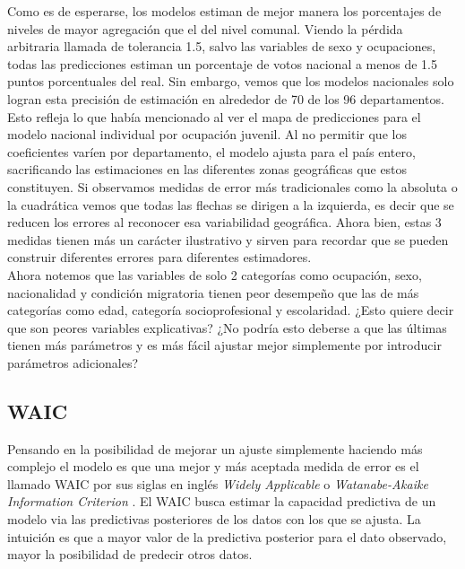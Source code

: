 Como es de esperarse, los modelos estiman de mejor manera los porcentajes de niveles de mayor agregación que el del nivel comunal. Viendo la pérdida arbitraria llamada de tolerancia 1.5, salvo las variables de sexo y ocupaciones, todas las predicciones estiman un porcentaje de votos nacional a menos de 1.5 puntos porcentuales del real. Sin embargo, vemos que los modelos nacionales solo logran esta precisión de estimación en alrededor de 70 de los 96 departamentos.\\ 

Esto refleja lo que había mencionado al ver el mapa de predicciones para el modelo nacional individual por ocupación juvenil. Al no permitir que los coeficientes varíen por departamento, el modelo ajusta para el país entero, sacrificando las estimaciones en las diferentes zonas geográficas que estos constituyen. Si observamos medidas de error más tradicionales como la absoluta o la cuadrática vemos que todas las flechas se dirigen a la izquierda, es decir que se reducen los errores al reconocer esa variabilidad geográfica. Ahora bien, estas 3 medidas tienen más un carácter ilustrativo y sirven para recordar que se pueden construir diferentes errores para diferentes estimadores.\\ 

Ahora notemos que las variables de solo 2 categorías como ocupación, sexo, nacionalidad y condición migratoria tienen peor desempeño que las de más categorías como edad, categoría socioprofesional y escolaridad. ¿Esto quiere decir que son peores variables explicativas? ¿No podría esto deberse a que las últimas tienen más parámetros y es más fácil ajustar mejor simplemente por introducir parámetros adicionales?

\subsection{WAIC}

Pensando en la posibilidad de mejorar un ajuste simplemente haciendo más complejo el modelo es que una mejor y más aceptada medida de error es el llamado WAIC por sus siglas en inglés \textit{Widely Applicable} o \textit{Watanabe-Akaike Information Criterion} \parencite{Vehtari16}. El WAIC busca estimar la capacidad predictiva de un modelo via las predictivas posteriores de los datos con los que se ajusta. La intuición es que a mayor valor de la predictiva posterior para el dato observado, mayor la posibilidad de predecir otros datos.\\ 

